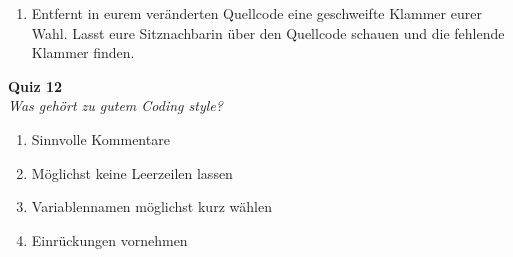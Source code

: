 \begin{spiel}
    \begin{enumerate}
        \item Entfernt in eurem veränderten Quellcode eine geschweifte Klammer
              eurer Wahl. Lasst eure Sitznachbarin über den Quellcode schauen und die
              fehlende Klammer finden.
    \end{enumerate}
\end{spiel}

\textbf{Quiz 12}\\
\textit{Was gehört zu gutem Coding style?}
\begin{enumerate}[label=\alph*)]
    \item Sinnvolle Kommentare
    \item Möglichst keine Leerzeilen lassen
    \item Variablennamen möglichst kurz wählen
    \item Einrückungen vornehmen
\end{enumerate}
